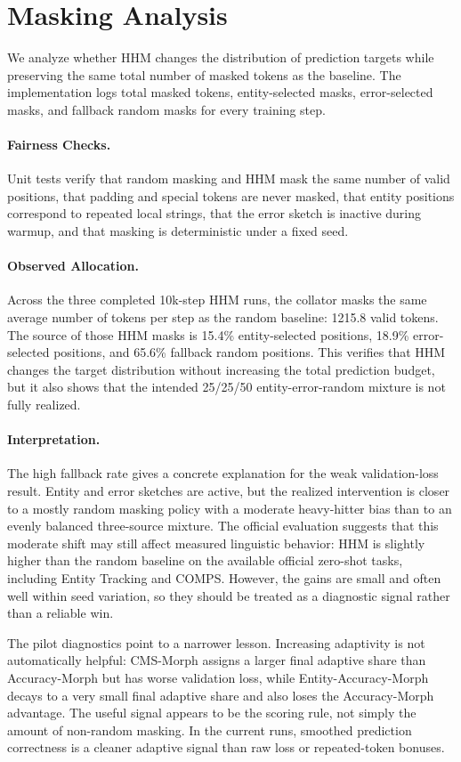 \section{Masking Analysis}

We analyze whether HHM changes the distribution of prediction targets while preserving the same total number of masked tokens as the baseline. The implementation logs total masked tokens, entity-selected masks, error-selected masks, and fallback random masks for every training step.

\paragraph{Fairness Checks.}
Unit tests verify that random masking and HHM mask the same number of valid positions, that padding and special tokens are never masked, that entity positions correspond to repeated local strings, that the error sketch is inactive during warmup, and that masking is deterministic under a fixed seed.

\paragraph{Observed Allocation.}
Across the three completed 10k-step HHM runs, the collator masks the same average number of tokens per step as the random baseline: 1215.8 valid tokens. The source of those HHM masks is 15.4\% entity-selected positions, 18.9\% error-selected positions, and 65.6\% fallback random positions. This verifies that HHM changes the target distribution without increasing the total prediction budget, but it also shows that the intended 25/25/50 entity-error-random mixture is not fully realized.

\paragraph{Interpretation.}
The high fallback rate gives a concrete explanation for the weak validation-loss result. Entity and error sketches are active, but the realized intervention is closer to a mostly random masking policy with a moderate heavy-hitter bias than to an evenly balanced three-source mixture. The official evaluation suggests that this moderate shift may still affect measured linguistic behavior: HHM is slightly higher than the random baseline on the available official zero-shot tasks, including Entity Tracking and COMPS. However, the gains are small and often well within seed variation, so they should be treated as a diagnostic signal rather than a reliable win.

The pilot diagnostics point to a narrower lesson. Increasing adaptivity is not automatically helpful: CMS-Morph assigns a larger final adaptive share than Accuracy-Morph but has worse validation loss, while Entity-Accuracy-Morph decays to a very small final adaptive share and also loses the Accuracy-Morph advantage. The useful signal appears to be the scoring rule, not simply the amount of non-random masking. In the current runs, smoothed prediction correctness is a cleaner adaptive signal than raw loss or repeated-token bonuses.
